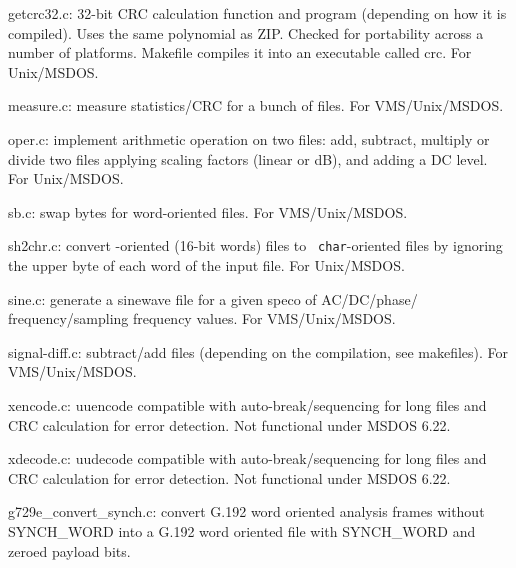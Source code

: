 \begin{Descr}{40mm}
\item[getcrc32.c:]
         32-bit CRC calculation function and program (depending on
         how it is compiled). Uses the same polynomial as
         ZIP. Checked for portability across a number of
         platforms. Makefile compiles it into an executable called
         crc. For Unix/MSDOS.

\item[measure.c:]
        measure statistics/CRC for a bunch of files.  For
        VMS/Unix/MSDOS.

\item[oper.c:]
            implement arithmetic operation on two files: add,
            subtract, multiply or divide two files applying
            scaling factors (linear or dB), and adding a DC
            level. For Unix/MSDOS.

\item[sb.c:]
        swap bytes for word-oriented files. For
        VMS/Unix/MSDOS.

\item[sh2chr.c:]
           convert \short-oriented (16-bit words) files to {\tt
           char}-oriented files by ignoring the upper byte of each
           word of the input file. For Unix/MSDOS.

\item[sine.c:]
        generate a sinewave file for a given speco of
        AC/DC/phase/ frequency/sampling frequency values. For
        VMS/Unix/MSDOS.

\item[signal-diff.c:]
        subtract/add files (depending on the compilation, see
        makefiles). For VMS/Unix/MSDOS.


\item[xencode.c:]
        uuencode compatible with auto-break/sequencing for
        long files and CRC calculation for error
        detection. Not functional under MSDOS 6.22.

\item[xdecode.c:]
        uudecode compatible with auto-break/sequencing for
        long files and CRC calculation for error
        detection. Not functional under MSDOS 6.22.

\item[g729e\_convert\_synch.c:]
        convert G.192 word oriented analysis 
        frames without SYNCH\_WORD into a G.192 word oriented 
        file with SYNCH\_WORD and zeroed payload bits. 
         
\end{Descr}


